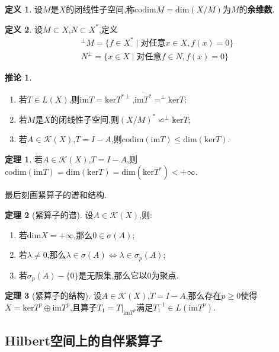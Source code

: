 \documentclass{ctexart}
\theoremstyle{definition}
\newtheorem{definition}{定义}
\newtheorem{theorem}{定理}
\newtheorem{corollary}{推论}
\theoremstyle{remark}
\begin{document}
	\begin{definition}
		设$M$是$X$的闭线性子空间,称$\mathrm{codim}M=\mathrm{dim}(X/M)$为$M$的\textbf{余维数}.
	\end{definition}
	\begin{definition}
		设$M\subset X$,$N\subset X^*$,定义
		\begin{align*}
			& ^\perp M=\{f\in X^*\mid \mbox{对任意}x\in X,f(x)=0\} \\
			& N^\perp=\{x\in X\mid \mbox{对任意}f\in N,f(x)=0\}
		\end{align*}
	\end{definition}
	\begin{corollary}
		\begin{enumerate}
			\item 若$T\in L(X)$,则$\overline{\mathrm{im}T}=\mathrm{ker}T^{*\perp}$,$\overline{\mathrm{im}T^*}=^\perp\mathrm{ker}T$;
			\item 若$M$是$X$的闭线性子空间,则$(X/M)^*\backsimeq^\perp\mathrm{ker}T$;
			\item 若$A\in\mathcal{K}(X)$,$T=I-A$,则$\mathrm{codim}(\mathrm{im}T)\le\mathrm{dim}(\mathrm{ker}T)$.
		\end{enumerate}
	\end{corollary}
	\begin{theorem}
		若$A\in\mathcal{K}(X)$,$T=I-A$,则$\mathrm{codim}(\mathrm{im}T)=\mathrm{dim}(\mathrm{ker}T)=\mathrm{dim}(\mathrm{ker}T^*)<+\infty$.
	\end{theorem}
	
	最后刻画紧算子的谱和结构.
	\begin{theorem}[紧算子的谱]
		设$A\in\mathcal{K}(X)$,则:
		\begin{enumerate}
			\item 若$\mathrm{dim}X=+\infty$,那么$0\in\sigma(A)$;
			\item 若$\lambda\ne 0$,那么$\lambda\in\sigma(A)\Leftrightarrow\lambda\in\sigma_p(A)$;
			\item 若$\sigma_p(A)-\{0\}$是无限集,那么它以0为聚点.
		\end{enumerate}
	\end{theorem}
	\begin{theorem}[紧算子的结构]
		设$A\in\mathcal{K}(X)$,$T=I-A$,那么存在$p\ge 0$使得$X=\mathrm{ker}T^p\oplus\mathrm{im}T^p$,且算子$T_1=T|_{\mathrm{im}T^p}$满足$T_1^{-1}\in L(\mathrm{im}T^p)$.
	\end{theorem}
	
	\subsection{Hilbert空间上的自伴紧算子}
	
\end{document}
